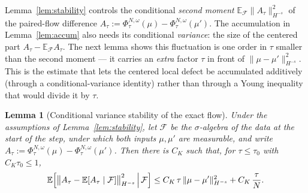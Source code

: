 \documentclass[a4paper,fleqn]{cas-sc}
\newtheorem{lemma}[theorem]{Lemma}
\theoremstyle{definition}
\theoremstyle{remark}
\begin{document}
Lemma~\ref{lem:stability} controls the conditional \emph{second moment}
$\mathbb E_{\mathcal F}\|A_\tau\|_{H^{-s}}^2$ of the paired-flow difference
$A_\tau:=\Phi^{N,\omega}_\tau(\mu)-\Phi^{N,\omega}_\tau(\mu')$. The accumulation in
Lemma~\ref{lem:accum} also needs its conditional \emph{variance}: the size of the
centered part $A_\tau-\mathbb E_{\mathcal F}A_\tau$. The next lemma shows this
fluctuation is one order in $\tau$ smaller than the second moment --- it carries an
\emph{extra} factor $\tau$ in front of $\|\mu-\mu'\|_{H^{-s}}^2$. This is the
estimate that lets the centered local defect be accumulated additively (through a
conditional-variance identity) rather than through a Young inequality that would
divide it by $\tau$.

\begin{lemma}[Conditional variance stability of the exact flow]\label{lem:stability-var}
Under the assumptions of Lemma~\ref{lem:stability}, let $\mathcal F$ be the
$\sigma$-algebra of the data at the start of the step, under which both inputs
$\mu,\mu'$ are measurable, and write
$A_\tau:=\Phi^{N,\omega}_\tau(\mu)-\Phi^{N,\omega}_\tau(\mu')$. Then there is $C_K$
such that, for $\tau\le\tau_0$ with $C_K\tau_0\le1$,
\begin{equation}\label{eq:stab-var}
\mathbb E\Bigl[\bigl\|A_\tau-\mathbb E[A_\tau\mid\mathcal F]\bigr\|_{H^{-s}}^2
\,\Big|\,\mathcal F\Bigr]
\le C_K\,\tau\,\|\mu-\mu'\|_{H^{-s}}^2+C_K\,\frac{\tau}{N}.
\end{equation}
\end{lemma}
\end{document}
